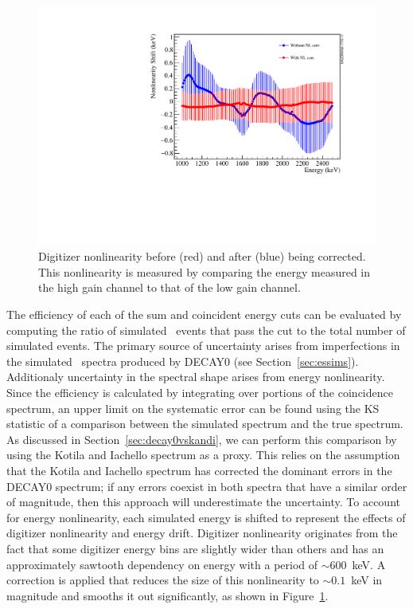 \documentclass[/main.tex]{subfiles}
\begin{document}
\begin{figure}[h]
  \centering
  \includegraphics[width=0.8\linewidth]{DigitizerNonlinearity}
  \caption[Measured Digitizer Nonlinearity vs Energy]{\label{fig:dignonlin}
    Digitizer nonlinearity before (red) and after (blue) being corrected. This nonlinearity is measured by comparing the energy measured in the high gain channel to that of the low gain channel.
  }
\end{figure}
The efficiency of each of the sum and coincident energy cuts can be evaluated by computing the ratio of simulated \bbes\ events that pass the cut to the total number of simulated events.
The primary source of uncertainty arises from imperfections in the simulated \bbes\ spectra produced by DECAY0 (see Section~\ref{sec:essims}).
Additionaly uncertainty in the spectral shape arises from energy nonlinearity.
Since the efficiency is calculated by integrating over portions of the coincidence spectrum, an upper limit on the systematic error can be found using the KS statistic of a comparison between the simulated spectrum and the true spectrum.
As discussed in Section~\ref{sec:decay0vskandi}, we can perform this comparison by using the Kotila and Iachello spectrum as a proxy.
This relies on the assumption that the Kotila and Iachello spectrum has corrected the dominant errors in the DECAY0 spectrum; if any errors coexist in both spectra that have a similar order of magnitude, then this approach will underestimate the uncertainty.
To account for energy nonlinearity, each simulated energy is shifted to represent the effects of digitizer nonlinearity and energy drift.
Digitizer nonlinearity originates from the fact that some digitizer energy bins are slightly wider than others and has an approximately sawtooth dependency on energy with a period of ${\sim}600$~keV.
A correction is applied that reduces the size of this nonlinearity to ${\sim}0.1$~keV in magnitude and smooths it out significantly, as shown in Figure~\ref{fig:dignonlin}.
\end{document}
